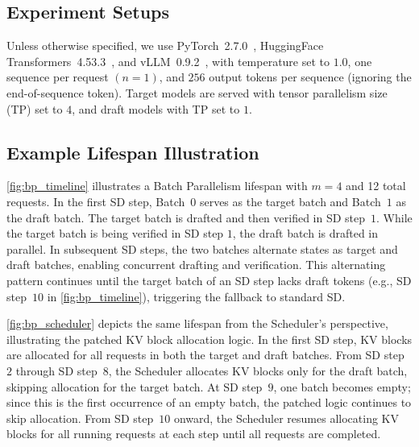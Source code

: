 

\subsection{Experiment Setups}
\label{app:exp-setup}
Unless otherwise specified, we use PyTorch~2.7.0~\citep{pytorch27}, HuggingFace Transformers~4.53.3~\citep{transformers4533}, and vLLM~0.9.2~\citep{vllm092}, with temperature set to $1.0$, one sequence per request $(n=1)$, and $256$ output tokens per sequence (ignoring the end-of-sequence token). Target models are served with tensor parallelism size (TP) set to $4$, and draft models with TP set to $1$.


\subsection{Example Lifespan Illustration}
\label{app:example-illust}
\cref{fig:bp_timeline} illustrates a Batch Parallelism lifespan with $m=4$ and 12 total requests. In the first SD step, Batch~$0$ serves as the target batch and Batch~$1$ as the draft batch. The target batch is drafted and then verified in SD step~$1$. While the target batch is being verified in SD step $1$, the draft batch is drafted in parallel. In subsequent SD steps, the two batches alternate states as target and draft batches, enabling concurrent drafting and verification. This alternating pattern continues until the target batch of an SD step lacks draft tokens (e.g., SD step~$10$ in \cref{fig:bp_timeline}), triggering the fallback to standard SD.


\cref{fig:bp_scheduler} depicts the same lifespan from the Scheduler's perspective, illustrating the patched KV block allocation logic. In the first SD step, KV blocks are allocated for all requests in both the target and draft batches. From SD step~$2$ through SD step~$8$, the Scheduler allocates KV blocks only for the draft batch, skipping allocation for the target batch. At SD step~$9$, one batch becomes empty; since this is the first occurrence of an empty batch, the patched logic continues to skip allocation. From SD step~$10$ onward, the Scheduler resumes allocating KV blocks for all running requests at each step until all requests are completed.


